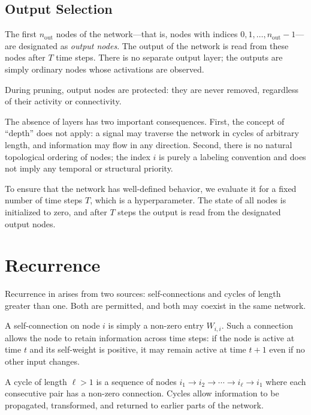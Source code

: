\subsection{Output Selection}

The first $n_{\text{out}}$ nodes of the network---that is, nodes with
indices $0, 1, \ldots, n_{\text{out}} - 1$---are designated as
\emph{output nodes}. The output of the network is read from these nodes
after $T$ time steps. There is no separate output layer; the outputs
are simply ordinary nodes whose activations are observed.

During pruning, output nodes are protected: they are never removed,
regardless of their activity or connectivity.

\begin{remark}
The absence of layers has two important consequences. First, the
concept of ``depth'' does not apply: a signal may traverse the network
in cycles of arbitrary length, and information may flow in any
direction. Second, there is no natural topological ordering of nodes;
the index $i$ is purely a labeling convention and does not imply any
temporal or structural priority.
\end{remark}

To ensure that the network has well-defined behavior, we evaluate it for
a fixed number of time steps $T$, which is a hyperparameter. The state
of all nodes is initialized to zero, and after $T$ steps the output is
read from the designated output nodes.

\section{Recurrence}
\label{sec:method-recurrence}

Recurrence in \modnet{} arises from two sources: self-connections and
cycles of length greater than one. Both are permitted, and both may
coexist in the same network.

A self-connection on node $i$ is simply a non-zero entry $W_{i,i}$.
Such a connection allows the node to retain information across time
steps: if the node is active at time $t$ and its self-weight is
positive, it may remain active at time $t+1$ even if no other input
changes.

A cycle of length $\ell > 1$ is a sequence of nodes
$i_1 \to i_2 \to \cdots \to i_\ell \to i_1$ where each consecutive
pair has a non-zero connection. Cycles allow information to be
propagated, transformed, and returned to earlier parts of the network.

